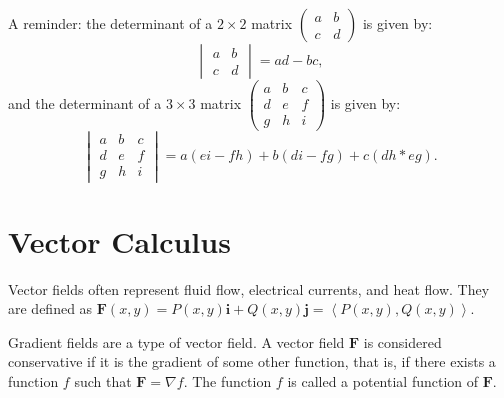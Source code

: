 \documentclass{article}
\begin{document}
A reminder: the determinant of a 
$2 \times 2$ matrix $\begin{pmatrix} a & b \\ c & d \end{pmatrix}$ is given by: 
\[ 
\begin{vmatrix} 
a & b \\ 
c & d 
\end{vmatrix} = ad - bc,
\]
and the determinant of a 
$3 \times 3$ matrix $\begin{pmatrix} a & b & c \\ d & e & f \\ g & h & i \end{pmatrix}$ is given by:
\[
\begin{vmatrix}
    a & b & c \\ 
    d & e & f \\ 
    g & h & i
\end{vmatrix} = 
a(ei - fh) + b(di - fg) + c(dh * eg).
\]

\section*{Vector Calculus}

Vector fields often represent fluid flow, electrical currents, and heat flow.
They are defined as $\mathbf{F}(x,y) = P(x,y)\mathbf{i} + Q(x,y)\mathbf{j}
= \left\langle P(x,y), Q(x,y) \right\rangle$.

Gradient fields are a type of vector field. A vector field $\mathbf{F}$ is 
considered conservative if it is the gradient of some other function, 
that is, if there exists a function $f$ such that $\mathbf{F} = \nabla f$. 
The function $f$ is called a potential function of $\mathbf{F}$.
\end{document}
